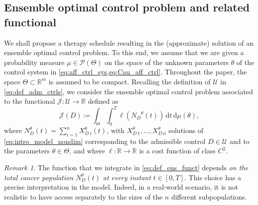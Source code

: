\documentclass[a4paper,12pt, reqno]{amsart}
\theoremstyle{plain}
\theoremstyle{definition}
\theoremstyle{remark}
\newtheorem{remark}{Remark}
\numberwithin{equation}{section}
\newcommand{\J}{\mathcal{J}}
\newcommand{\R}{\mathbb{R}}
\newcommand{\U}{\mathcal{U}}
\newcommand{\de}{\,\mathrm{d}}
\begin{document}
\subsection{Ensemble optimal control problem and related functional}
We shall propose a therapy schedule resulting {in the} (approximate) solution of an ensemble optimal control problem. 
To this end, we assume that we are given a probability measure $\mu\in\mathcal{P}(\Theta)$ on the space of the unknown parameters $\theta$ of the control system in \cref{eq:aff_ctrl_sys,eq:Cau_aff_ctrl}. Throughout the paper, the space $\Theta\subset \R^{m}$ is assumed to be compact.
Recalling the definition of $\U$ in \cref{eq:def_adm_ctrls}, we consider the ensemble optimal control problem associated to the functional $\J\colon \U\to \R$ defined as 
\begin{equation} \label{eq:def_ens_funct}
    \J({D}) \coloneqq  \int_\Theta  \int_0^T \ell\left({N_D}^\theta({t} )\right)  
    \de {t} \de\mu(\theta),
\end{equation}
where {$N_D^\theta(t)=\sum_{i=1}^nX_{D\ i}^\theta(t)$, with $X_{D\, 1}^\theta, \ldots, X_{D\, n}^\theta$} solutions of \cref{eq:intro_model_nondim} corresponding to the admissible control ${D}\in\U$ and to the parameters $\theta\in\Theta$, and where $\ell\colon \R \to\R$ is a cost function of class $C^2$.

\begin{remark} \label{rmk:struct_cost}
    The function that we integrate in \cref{eq:def_ens_funct} depends \emph{on the total cancer population ${N_D^\theta(t)}$ at every instant $t\in [0,T]$}. 
    This choice has a precise interpretation in the model. Indeed, in a real-world scenario, it is not realistic to have access separately to the sizes of the {$n$ different sub\-populations}.
\end{remark}
\end{document}
